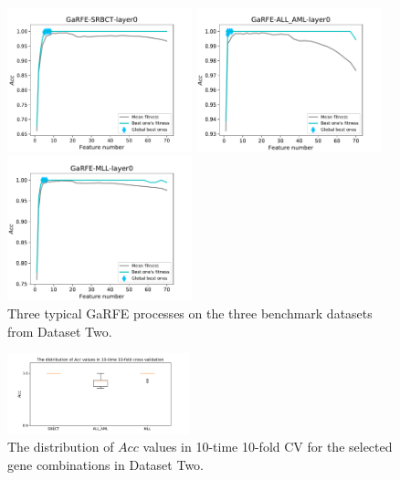 \documentclass[10pt,journal,compsoc]{IEEEtran}
\begin{document}
	\begin{figure}[!htbp]
		\begin{minipage}[t]{0.3\textwidth}
			\centering
			\includegraphics[height=1.65in]{pictures/SRBCT-RFE.pdf}
		\end{minipage}
		\begin{minipage}[t]{0.3\textwidth}
			\centering
			\includegraphics[height=1.65in]{pictures/ALLAML-RFE.pdf}
		\end{minipage}
		\begin{minipage}[t]{0.3\textwidth}
			\centering
			\includegraphics[height=1.65in]{pictures/MLL-RFE.pdf}
		\end{minipage}
		\caption{Three typical GaRFE processes on the three benchmark datasets from Dataset Two.}
		\label{Fig:3 RFE on benchmarks}
	\end{figure}
	
	\begin{figure}[htbp]
		\centering
		\includegraphics[width=0.47\textwidth]{pictures/CV2.pdf}
		\caption{The distribution of $Acc$ values in 10-time 10-fold CV for the selected gene combinations in Dataset Two.}
		\label{Fig:CV2}
	\end{figure}
	
\end{document}
